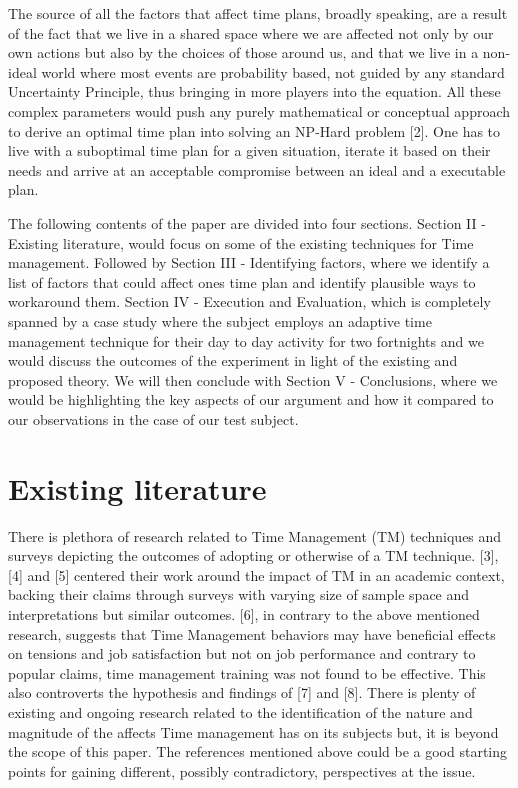 \documentclass[conference]{IEEEtran}
\begin{document}
The source of all the factors that affect time plans, broadly speaking, are a result of the fact that we live in a shared space where we are affected not only by our own actions but also by the choices of those around us, and that we live in a non-ideal world where most events are probability based, not guided by any standard Uncertainty Principle, thus bringing in more players into the equation. All these complex parameters would push any purely mathematical or conceptual approach to derive an optimal time plan into solving an NP-Hard problem [2]. One has to live with a suboptimal time plan for a given situation, iterate it based on their needs and arrive at an acceptable compromise between an ideal and a executable plan.

The following contents of the paper are divided into four sections. Section II - Existing literature, would focus on some of the existing techniques for Time management. Followed by Section III - Identifying factors, where we identify a list of factors that could affect ones time plan and identify plausible ways to workaround them. Section IV - Execution and Evaluation, which is completely spanned by a case study where the subject employs an adaptive time management technique for their day to day activity for two fortnights and we would discuss the outcomes of the experiment in light of the existing and proposed theory. We will then conclude with Section V - Conclusions, where we would be highlighting the key aspects of our argument and how it compared to our observations in the case of our test subject.

\section{Existing literature}
There is plethora of research related to Time Management (TM) techniques and surveys depicting the outcomes of adopting or otherwise of a TM technique. [3], [4] and [5] centered their work around the impact of TM in an academic context, backing their claims through surveys with varying size of sample space and interpretations but similar outcomes. [6], in contrary to the above mentioned research, suggests that Time Management behaviors may have beneficial effects on tensions and job satisfaction but not on job performance and contrary to popular claims, time management training was not found to be effective. This also controverts the hypothesis and findings of [7] and [8]. There is plenty of existing and ongoing research related to the identification of the nature and magnitude of the affects Time management has on its subjects but, it is beyond the scope of this paper. The references mentioned above could be a good starting points for gaining different, possibly contradictory, perspectives at the issue.
\end{document}

